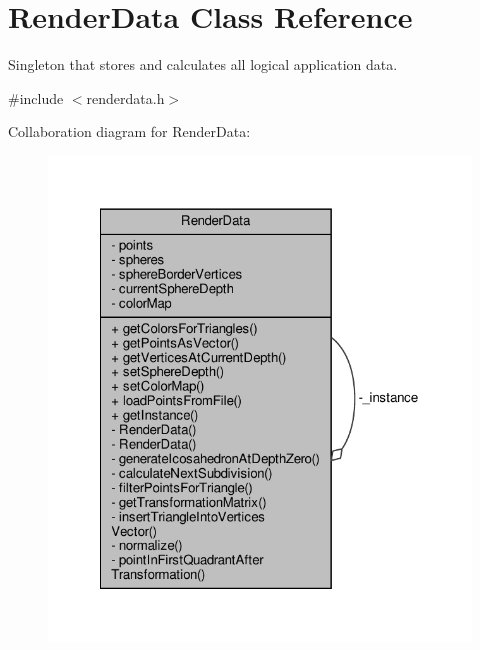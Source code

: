 \hypertarget{class_render_data}{}\section{Render\+Data Class Reference}
\label{class_render_data}


Singleton that stores and calculates all logical application data.  




{\ttfamily \#include $<$renderdata.\+h$>$}



Collaboration diagram for Render\+Data\+:\nopagebreak
\begin{figure}[H]
\begin{center}
\leavevmode
\includegraphics[width=322pt]{db/d80/class_render_data__coll__graph}
\end{center}
\end{figure}
